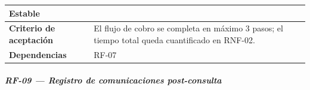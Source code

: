 \documentclass[
]{article}
\begin{document}
{\begin{longtable}[]{|
  >{\raggedright\arraybackslash}p{}|
  >{\raggedright\arraybackslash}p{}|}
\begin{minipage}[t]{\linewidth}
Estable
\end{minipage} \\
\hline
\textbf{Criterio de aceptación} &
\begin{minipage}[t]{\linewidth}\raggedright
El flujo de cobro se completa en máximo 3 pasos; el tiempo total queda cuantificado en RNF-02.
\end{minipage} \\
\hline
\textbf{Dependencias} & \begin{minipage}[t]{\linewidth}\raggedright
RF-07
\end{minipage} \\
\hline
\end{longtable}
}

\subparagraph{RF-09 --- Registro de comunicaciones post-consulta}\label{rf-09-registro-de-comunicaciones-post-consulta}
\end{document}
